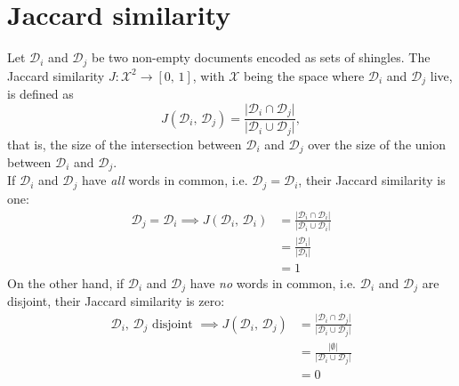 \documentclass{article}
\begin{document}
  \newpage
  \section{Jaccard similarity}
  Let \( \mathcal D_i \) and \( \mathcal D_j \) be two non-empty documents
  encoded as sets of shingles. The Jaccard similarity
  \( J \! : \mathcal X^2 \to [ 0, \, 1 ] \), with \( \mathcal X \) being the
  space where \( \mathcal D_i \) and \( \mathcal D_j \) live, is defined as
  \[
    J ( \mathcal D_i, \, \mathcal D_j ) =
    \frac{ \lvert \mathcal D_i \cap \mathcal D_j \rvert }{ \lvert \mathcal D_i \cup \mathcal D_j \rvert } \mathrm ,
  \]
  that is, the size of the intersection between \( \mathcal D_i \) and
  \( \mathcal D_j \) over the size of the union between \( \mathcal D_i \) and
  \( \mathcal D_j \). \\
  If \( \mathcal D_i \) and \( \mathcal D_j \) have \emph{all} words in common,
  i.e. \( \mathcal D_j = \mathcal D_i \), their Jaccard similarity is one:
  \begin{align*}
    \mathcal D_j = \mathcal D_i \implies J ( \mathcal D_i, \, \mathcal D_i )
    & = \frac{ \lvert \mathcal D_i \cap \mathcal D_i \rvert }{ \lvert \mathcal D_i \cup \mathcal D_i \rvert } \\
    & = \frac{ \lvert \mathcal D_i \rvert }{ \lvert \mathcal D_i \rvert } \\
    & = 1
  \end{align*}
  On the other hand, if \( \mathcal D_i \) and \( \mathcal D_j \) have
  \emph{no} words in common, i.e. \( \mathcal D_i \) and \( \mathcal D_j \) are
  disjoint, their Jaccard similarity is zero:
  \begin{align*}
    \mathcal D_i, \, \mathcal D_j \text{ disjoint } \implies
    J ( \mathcal D_i, \, \mathcal D_j )
    & = \frac{ \lvert \mathcal D_i \cap \mathcal D_j \rvert }{ \lvert \mathcal D_i \cup \mathcal D_j \rvert } \\
    & = \frac{ \lvert \emptyset \rvert }{ \lvert \mathcal D_i \cup \mathcal D_j \rvert } \\
    & = 0
  \end{align*}
\end{document}

